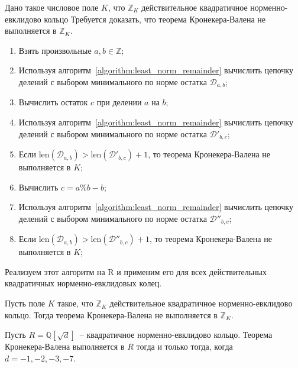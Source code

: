 \documentclass[_00_autoref.tex]{subfiles}
\begin{document}
\begin{algorithm}\label{algorithm:kronecker_vahlen_special}
    Дано такое числовое поле $K$, что $\mathbb{Z}_K$ действительное квадратичное норменно-евклидово кольцо
    Требуется доказать, что теорема Кронекера-Валена не выполняется в $\mathbb{Z}_K$.

    \begin{enumerate}
        \item Взять произвольные $a, b \in \mathbb{Z}$;

        \item Используя алгоритм~\ref{algorithm:least_norm_remainder} вычислить цепочку делений с выбором минимального по норме остатка $\mathcal{D}_{a,b}$;

        \item Вычислить остаток $c$ при делении $a$ на $b$;

        \item Используя алгоритм~\ref{algorithm:least_norm_remainder} вычислить цепочку делений с выбором минимального по норме остатка $\mathcal{D}'_{b, c}$;

        \item Если $\textrm{len}(\mathcal{D}_{a, b}) > \textrm{len}(\mathcal{D}'_{b, c}) + 1$, то теорема Кронекера-Валена не выполняется в $K$;

        \item Вычислить $c = a \% b - b$;

        \item Используя алгоритм~\ref{algorithm:least_norm_remainder} вычислить цепочку делений с выбором минимального по норме остатка $\mathcal{D}''_{b,c}$;

        \item Если $\textrm{len}(\mathcal{D}_{a, b}) > \textrm{len}(\mathcal{D}''_{b, c}) + 1$, то теорема Кронекера-Валена не выполняется в $K$;
    \end{enumerate}
\end{algorithm}

Реализуем этот алгоритм на R и применим его для всех действительных квадратичных норменно-евклидовых колец.

\begin{theorem}\label{theorem:kronecker}
    Пусть поле $K$ такое, что $\mathbb{Z}_K$ действительное квадратичное норменно-евклидово кольцо.
    Тогда теорема Кронекера-Валена не выполняется в $\mathbb{Z}_K$.
\end{theorem}

\begin{proposition}
    Пусть $R = \mathbb{Q}[\sqrt{d}]$~-- квадратичное норменно-евклидово кольцо.
    Теорема Кронекера-Валена выполняется в $R$ тогда и только тогда, когда $d=-1, -2, -3, -7$.
\end{proposition}
\end{document}
